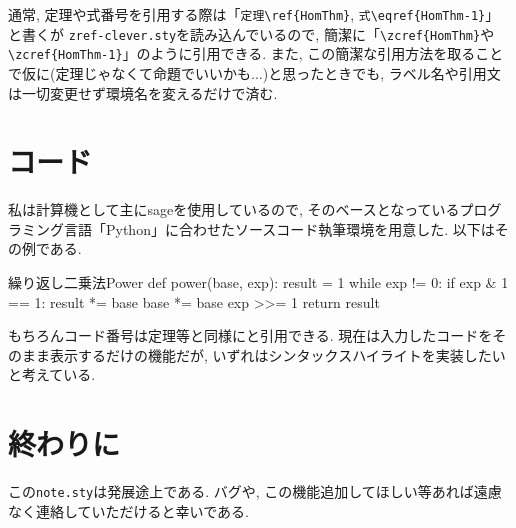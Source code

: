 \documentclass[
	paper=a4,
	fontsize=10pt, %
	jafontsize=12Q,
	jafontscale=0.92,
]{jlreq}
\begin{document}
通常, 定理や式番号を引用する際は「\verb|定理\ref{HomThm}|, \verb|式\eqref{HomThm-1}|」と書くが
\texttt{zref-clever.sty}を読み込んでいるので, 簡潔に「\verb|\zcref{HomThm}|や\verb|\zcref{HomThm-1}|」のように引用できる.
また, この簡潔な引用方法を取ることで仮に(定理じゃなくて命題でいいかも...)と思ったときでも, ラベル名や引用文は一切変更せず環境名を変えるだけで済む.

\section{コード}

私は計算機として主にsageを使用しているので, そのベースとなっているプログラミング言語「Python」に合わせたソースコード執筆環境を用意した.
以下はその例である.

\begin{pycode}{繰り返し二乗法}{Power}
	def power(base, exp):
			result = 1
			while exp != 0:
					if exp & 1 == 1:
							result *= base
					base *= base
					exp >>= 1
			return result
\end{pycode}

もちろんコード番号は定理等と同様にと引用できる.
現在は入力したコードをそのまま表示するだけの機能だが, いずれはシンタックスハイライトを実装したいと考えている.

\section{終わりに}

この\texttt{note.sty}は発展途上である.
バグや, この機能追加してほしい等あれば遠慮なく連絡していただけると幸いである.
\\

\lipsum[2-5]



\newpage
\nocite{*}
\printbibliography[title=参考文献]
\end{document}
